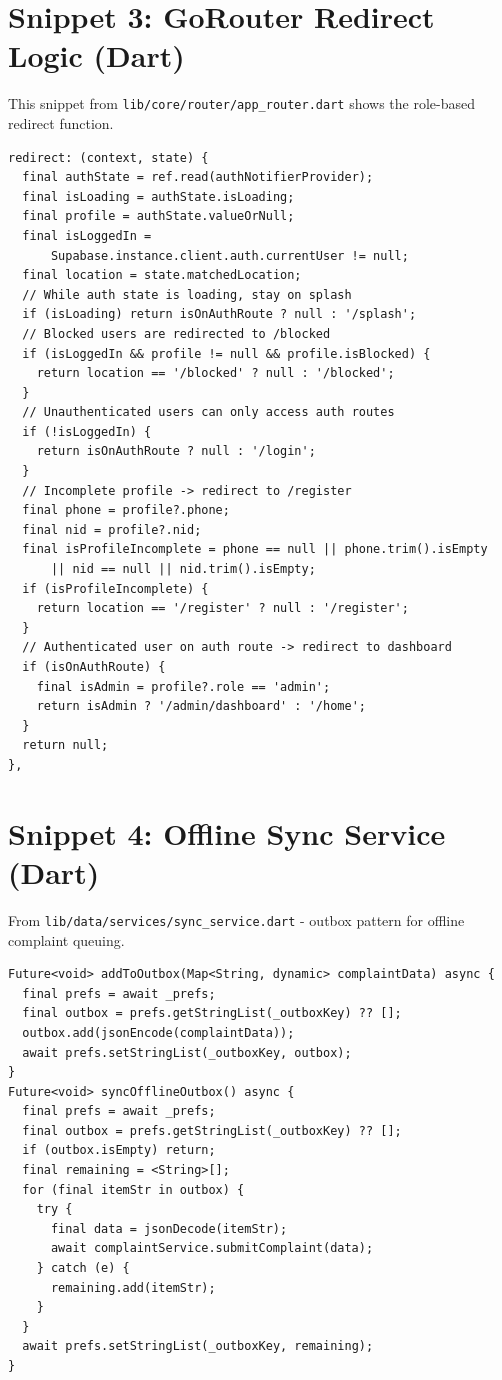 \documentclass[12pt, a4paper, twoside, openany]{report}
\begin{document}
\section*{Snippet 3: GoRouter Redirect Logic (Dart)}
This snippet from \texttt{lib/core/router/app\_router.dart} shows the role-based redirect function.
\begin{footnotesize}
\begin{verbatim}
redirect: (context, state) {
  final authState = ref.read(authNotifierProvider);
  final isLoading = authState.isLoading;
  final profile = authState.valueOrNull;
  final isLoggedIn = 
      Supabase.instance.client.auth.currentUser != null;
  final location = state.matchedLocation;
  // While auth state is loading, stay on splash
  if (isLoading) return isOnAuthRoute ? null : '/splash';
  // Blocked users are redirected to /blocked
  if (isLoggedIn && profile != null && profile.isBlocked) {
    return location == '/blocked' ? null : '/blocked';
  }
  // Unauthenticated users can only access auth routes
  if (!isLoggedIn) {
    return isOnAuthRoute ? null : '/login';
  }
  // Incomplete profile -> redirect to /register
  final phone = profile?.phone;
  final nid = profile?.nid;
  final isProfileIncomplete = phone == null || phone.trim().isEmpty 
      || nid == null || nid.trim().isEmpty;
  if (isProfileIncomplete) {
    return location == '/register' ? null : '/register';
  }
  // Authenticated user on auth route -> redirect to dashboard
  if (isOnAuthRoute) {
    final isAdmin = profile?.role == 'admin';
    return isAdmin ? '/admin/dashboard' : '/home';
  }
  return null;
},
\end{verbatim}
\end{footnotesize}
\vspace{1cm}
\section*{Snippet 4: Offline Sync Service (Dart)}
From \texttt{lib/data/services/sync\_service.dart} - outbox pattern for offline complaint queuing.
\begin{footnotesize}
\begin{verbatim}
Future<void> addToOutbox(Map<String, dynamic> complaintData) async {
  final prefs = await _prefs;
  final outbox = prefs.getStringList(_outboxKey) ?? [];
  outbox.add(jsonEncode(complaintData));
  await prefs.setStringList(_outboxKey, outbox);
}
Future<void> syncOfflineOutbox() async {
  final prefs = await _prefs;
  final outbox = prefs.getStringList(_outboxKey) ?? [];
  if (outbox.isEmpty) return;
  final remaining = <String>[];
  for (final itemStr in outbox) {
    try {
      final data = jsonDecode(itemStr);
      await complaintService.submitComplaint(data);
    } catch (e) {
      remaining.add(itemStr);
    }
  }
  await prefs.setStringList(_outboxKey, remaining);
}
\end{verbatim}
\end{footnotesize}
\vspace{1cm}
\end{document}
